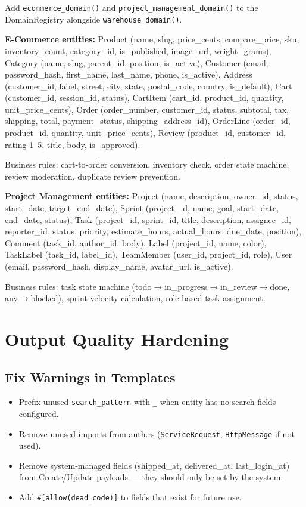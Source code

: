 \documentclass[11pt,a4paper]{article}
\begin{document}
Add \texttt{ecommerce\_domain()} and \texttt{project\_management\_domain()}
to the DomainRegistry alongside \texttt{warehouse\_domain()}.

\textbf{E-Commerce entities:} Product (name, slug, price\_cents, compare\_price,
sku, inventory\_count, category\_id, is\_published, image\_url, weight\_grams),
Category (name, slug, parent\_id, position, is\_active),
Customer (email, password\_hash, first\_name, last\_name, phone, is\_active),
Address (customer\_id, label, street, city, state, postal\_code, country, is\_default),
Cart (customer\_id, session\_id, status), CartItem (cart\_id, product\_id, quantity,
unit\_price\_cents), Order (order\_number, customer\_id, status, subtotal, tax,
shipping, total, payment\_status, shipping\_address\_id), OrderLine (order\_id,
product\_id, quantity, unit\_price\_cents), Review (product\_id, customer\_id,
rating 1--5, title, body, is\_approved).

Business rules: cart-to-order conversion, inventory check, order state machine,
review moderation, duplicate review prevention.

\textbf{Project Management entities:} Project (name, description, owner\_id,
status, start\_date, target\_end\_date), Sprint (project\_id, name, goal,
start\_date, end\_date, status), Task (project\_id, sprint\_id, title,
description, assignee\_id, reporter\_id, status, priority, estimate\_hours,
actual\_hours, due\_date, position), Comment (task\_id, author\_id, body),
Label (project\_id, name, color), TaskLabel (task\_id, label\_id),
TeamMember (user\_id, project\_id, role), User (email, password\_hash,
display\_name, avatar\_url, is\_active).

Business rules: task state machine (todo$\to$in\_progress$\to$in\_review$\to$done,
any$\to$blocked), sprint velocity calculation, role-based task assignment.

\section{Output Quality Hardening}

\subsection{Fix Warnings in Templates}

\begin{itemize}
\item Prefix unused \texttt{search\_pattern} with \texttt{\_} when entity
  has no search fields configured.
\item Remove unused imports from auth.rs (\texttt{ServiceRequest}, \texttt{HttpMessage}
  if not used).
\item Remove system-managed fields (shipped\_at, delivered\_at, last\_login\_at)
  from Create/Update payloads --- they should only be set by the system.
\item Add \texttt{\#[allow(dead\_code)]} to fields that exist for future use.
\end{itemize}
\end{document}
